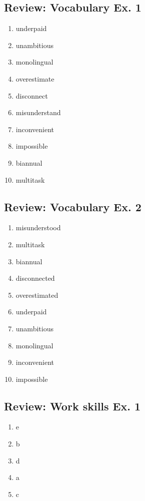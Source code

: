 \documentclass[12pt, a4paper, oneside]{article}
\begin{document}
  \subsection{Review: Vocabulary Ex. 1}
  \begin{enumerate}[1.]
    \item underpaid
    \item unambitious
    \item monolingual
    \item overestimate
    \item disconnect
    \item misunderstand
    \item inconvenient
    \item impossible
    \item biannual
    \item multitask
  \end{enumerate}

  \subsection{Review: Vocabulary Ex. 2}
  \begin{enumerate}[1.]
    \item misunderstood
    \item multitask
    \item biannual
    \item disconnected
    \item overestimated
    \item underpaid
    \item unambitious
    \item monolingual
    \item inconvenient
    \item impossible
  \end{enumerate}

  \subsection{Review: Work skills Ex. 1}
  \begin{enumerate}[1.]
    \item e
    \item b
    \item d
    \item a
    \item c
  \end{enumerate}
\end{document}
